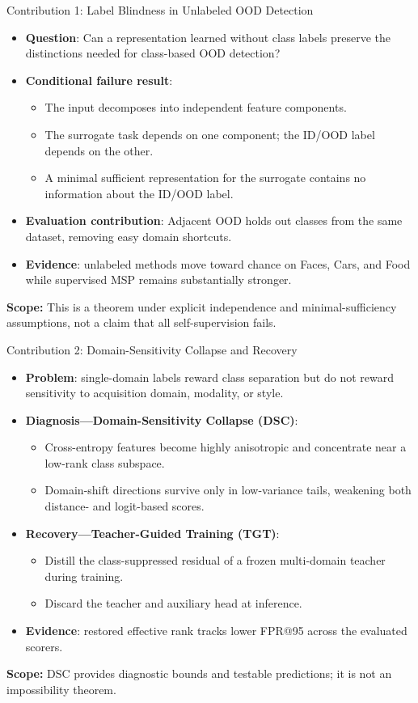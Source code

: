 \documentclass[aspectratio=1610]{beamer}
\newcommand{\scopefooter}[1]{%
  \vfill
  \begin{center}
    \footnotesize\textbf{Scope:} #1
  \end{center}%
}
\begin{document}
\begin{frame}{Contribution 1: Label Blindness in Unlabeled OOD Detection}
\begin{itemize}
  \item \textbf{Question}: Can a representation learned without class labels preserve the distinctions needed for class-based OOD detection?
  \item \textbf{Conditional failure result}:
  \begin{itemize}
    \item The input decomposes into independent feature components.
    \item The surrogate task depends on one component; the ID/OOD label depends on the other.
    \item A minimal sufficient representation for the surrogate contains no information about the ID/OOD label.
  \end{itemize}
  \item \textbf{Evaluation contribution}: Adjacent OOD holds out classes from the same dataset, removing easy domain shortcuts.
  \item \textbf{Evidence}: unlabeled methods move toward chance on Faces, Cars, and Food while supervised MSP remains substantially stronger.
\end{itemize}
\scopefooter{This is a theorem under explicit independence and minimal-sufficiency assumptions, not a claim that all self-supervision fails.}
\end{frame}

\begin{frame}{Contribution 2: Domain-Sensitivity Collapse and Recovery}
\begin{itemize}
  \item \textbf{Problem}: single-domain labels reward class separation but do not reward sensitivity to acquisition domain, modality, or style.
  \item \textbf{Diagnosis---Domain-Sensitivity Collapse (DSC)}:
  \begin{itemize}
    \item Cross-entropy features become highly anisotropic and concentrate near a low-rank class subspace.
    \item Domain-shift directions survive only in low-variance tails, weakening both distance- and logit-based scores.
  \end{itemize}
  \item \textbf{Recovery---Teacher-Guided Training (TGT)}:
  \begin{itemize}
    \item Distill the class-suppressed residual of a frozen multi-domain teacher during training.
    \item Discard the teacher and auxiliary head at inference.
  \end{itemize}
  \item \textbf{Evidence}: restored effective rank tracks lower FPR@95 across the evaluated scorers.
\end{itemize}
\scopefooter{DSC provides diagnostic bounds and testable predictions; it is not an impossibility theorem.}
\end{frame}
\end{document}
